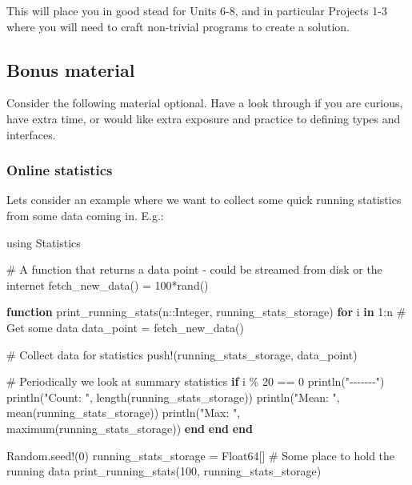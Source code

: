 \documentclass[
]{article}
\newenvironment{Shaded}{\begin{snugshade}}{\end{snugshade}}
\newcommand{\BuiltInTok}[1]{\textcolor[rgb]{0.00,0.23,0.31}{#1}}
\newcommand{\CommentTok}[1]{\textcolor[rgb]{0.37,0.37,0.37}{#1}}
\newcommand{\ControlFlowTok}[1]{\textcolor[rgb]{0.00,0.23,0.31}{\textbf{#1}}}
\newcommand{\DataTypeTok}[1]{\textcolor[rgb]{0.68,0.00,0.00}{#1}}
\newcommand{\FloatTok}[1]{\textcolor[rgb]{0.68,0.00,0.00}{#1}}
\newcommand{\FunctionTok}[1]{\textcolor[rgb]{0.28,0.35,0.67}{#1}}
\newcommand{\ImportTok}[1]{\textcolor[rgb]{0.00,0.46,0.62}{#1}}
\newcommand{\KeywordTok}[1]{\textcolor[rgb]{0.00,0.23,0.31}{\textbf{#1}}}
\newcommand{\NormalTok}[1]{\textcolor[rgb]{0.00,0.23,0.31}{#1}}
\newcommand{\OperatorTok}[1]{\textcolor[rgb]{0.37,0.37,0.37}{#1}}
\newcommand{\StringTok}[1]{\textcolor[rgb]{0.13,0.47,0.30}{#1}}
\begin{document}
This will place you in good stead for Units 6-8, and in particular
Projects 1-3 where you will need to craft non-trivial programs to create
a solution.

\subsection{Bonus material}\label{bonus-material}

Consider the following material optional. Have a look through if you are
curious, have extra time, or would like extra exposure and practice to
defining types and interfaces.

\subsubsection{Online statistics}\label{online-statistics}

Lets consider an example where we want to collect some quick running
statistics from some data coming in. E.g.:

\begin{Shaded}
\begin{Highlighting}[]
\ImportTok{using} \BuiltInTok{Statistics}

\CommentTok{\# A function that returns a data point {-} could be streamed from disk or the internet}
\FunctionTok{fetch\_new\_data}\NormalTok{() }\OperatorTok{=} \FloatTok{100}\FunctionTok{*rand}\NormalTok{()}

\KeywordTok{function} \FunctionTok{print\_running\_stats}\NormalTok{(n}\OperatorTok{::}\DataTypeTok{Integer}\NormalTok{, running\_stats\_storage)}
   \ControlFlowTok{for}\NormalTok{ i }\KeywordTok{in} \FloatTok{1}\OperatorTok{:}\NormalTok{n}
   \CommentTok{\# Get some data}
\NormalTok{   data\_point }\OperatorTok{=} \FunctionTok{fetch\_new\_data}\NormalTok{()}

   \CommentTok{\# Collect data for statistics}
   \FunctionTok{push!}\NormalTok{(running\_stats\_storage, data\_point)}

   \CommentTok{\# Periodically we look at summary statistics}
   \ControlFlowTok{if}\NormalTok{ i }\OperatorTok{\%} \FloatTok{20} \OperatorTok{==} \FloatTok{0}
   \FunctionTok{println}\NormalTok{(}\StringTok{"{-}{-}{-}{-}{-}{-}{-}"}\NormalTok{)}
   \FunctionTok{println}\NormalTok{(}\StringTok{"Count: "}\NormalTok{, }\FunctionTok{length}\NormalTok{(running\_stats\_storage))}
   \FunctionTok{println}\NormalTok{(}\StringTok{"Mean: "}\NormalTok{, }\FunctionTok{mean}\NormalTok{(running\_stats\_storage))}
   \FunctionTok{println}\NormalTok{(}\StringTok{"Max: "}\NormalTok{, }\FunctionTok{maximum}\NormalTok{(running\_stats\_storage))}
   \ControlFlowTok{end}
   \ControlFlowTok{end}
\KeywordTok{end}

\BuiltInTok{Random}\NormalTok{.}\FunctionTok{seed!}\NormalTok{(}\FloatTok{0}\NormalTok{)}
\NormalTok{running\_stats\_storage }\OperatorTok{=} \DataTypeTok{Float64}\NormalTok{[] }\CommentTok{\# Some place to hold the running data}
\FunctionTok{print\_running\_stats}\NormalTok{(}\FloatTok{100}\NormalTok{, running\_stats\_storage)}
\end{Highlighting}
\end{Shaded}
\end{document}
